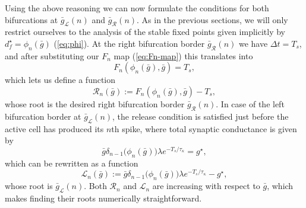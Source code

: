 Using the above reasoning we can now formulate the conditions for both bifurcations at $\bar g_{\mathcal{L}}(n)$ and $\bar g_{\mathcal{R}}(n)$.
As in the previous sections, we will only restrict ourselves to the analysis of the stable fixed points given implicitly by $d^\star_f=\phi_n(\bar g)$ (\cref{eq:phi}).
At the right bifurcation border $\bar g_{\mathcal{R}}(n)$ we have $\Delta t=T_{s}$, and after substituting our $F_n$ map (\cref{eq:Fn-map}) this translates into
\begin{equation}
	F_n(\phi_n(\bar g), \bar g) = T_{s},
\end{equation}
which lets us define a function
\begin{equation}
	\label{eq:R}
	\mathcal{R}_{n}(\bar g):=F_n(\phi_n(\bar g), \bar g)-T_{s},
\end{equation}
whose root is the desired right bifurcation border $\bar g_{\mathcal{R}}(n)$.
In case of the left bifurcation border at $\bar g_{\mathcal{L}}(n)$, the release condition is satisfied just before the active cell has produced its $n$th spike, where total synaptic conductance is given by
\begin{equation}
	\bar g \delta_{n-1}\big(\phi_n(\bar g)\big)\lambda e^{-T_{s}/\tau_\kappa} = g^\star,
\end{equation}
which can be rewritten as a function
\begin{equation}
	\label{eq:L}
	\mathcal{L}_n(\bar g):=\bar g \delta_{n-1}\big(\phi_n(\bar g)\big)\lambda e^{-T_{s}/\tau_\kappa} -g^\star,
\end{equation}
whose root is $\bar g_{\mathcal{L}}(n)$.
Both $\mathcal{R}_n$ and $\mathcal{L}_n$ are increasing with respect to $\bar g$, which makes finding their roots numerically straightforward.

